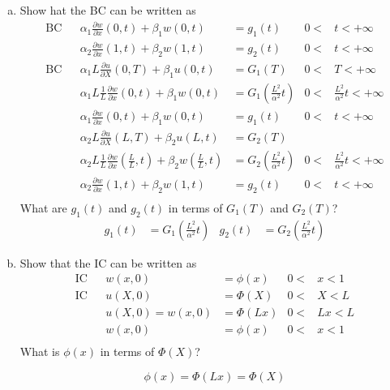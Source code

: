 \documentclass{article}
\begin{document}
\begin{enumerate}[(a)]
\item
Show hat the BC can be written as
\begin{align*}
  \text{BC}&&\alpha_1\frac{\partial w}{\partial x}(0,t)+\beta_1w(0,t)&=g_1(t)&0<&t<+\infty\\
  &&\alpha_2\frac{\partial w}{\partial x}(1,t)+\beta_2w(1,t)&=g_2(t)&0<&t<+\infty\\
  \text{BC}&&\alpha_1L\frac{\partial u}{\partial X}(0,T)+\beta _1u(0,t)&=G_1(T)&0<&T<+\infty\\
  &&\alpha_1L\frac{1}{L}\frac{\partial w}{\partial x}(0,t)+\beta _1w(0,t)&=G_1\left(\frac{L^2}{\alpha^2}t\right)&0<&\frac{L^2}{\alpha^2}t<+\infty\\
  &&\alpha_1\frac{\partial w}{\partial x}(0,t)+\beta _1w(0,t)&=g_1(t)&0<&t<+\infty\\
  &&\alpha_2L\frac{\partial u}{\partial X}(L,T)+\beta_2u(L,t)&=G_2(T)\\
  &&\alpha_2L\frac{1}{L}\frac{\partial w}{\partial x}\left(\frac{L}{L},t\right)+\beta _2w\left(\frac{L}{L},t\right)&=G_2\left(\frac{L^2}{\alpha^2}t\right)&0<&\frac{L^2}{\alpha^2}t<+\infty\\
  &&\alpha_2\frac{\partial w}{\partial x}\left(1,t\right)+\beta _2w\left(1,t\right)&=g_2\left(t\right)&0<&t<+\infty\\
\end{align*}
What are $g_1(t)$ and $g_2(t)$ in terms of $G_1(T)$ and $G_2(T)$?
\begin{align*}
  g_1(t)&=G_1\left(\frac{L^2}{\alpha^2}t\right)&
  g_2(t)&=G_2\left(\frac{L^2}{\alpha^2}t\right)
\end{align*}
\item
Show that the IC can be written as
\begin{align*}
  \text{IC}&&w(x,0)&=\phi(x)&0<&x<1\\
  \text{IC}&&u(X,0)&=\Phi(X)&0<&X<L\\
  &&u(X,0)=w(x,0)&=\Phi(Lx)&0<&Lx<L\\
  &&w(x,0)&=\phi(x)&0<&x<1\\
\end{align*}
What is $\phi(x)$ in terms of $\Phi(X)$?

\[\phi(x)=\Phi(Lx)=\Phi(X)\]

\end{enumerate}
\end{document}

